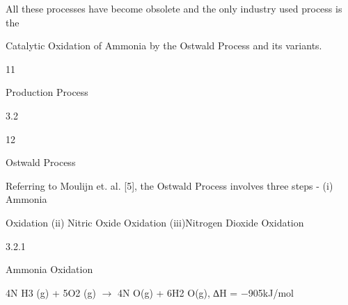 \documentclass[a4paper,portrait,12pt]{article}
\begin{document}
\begin{flushleft}
All these processes have become obsolete and the only industry used process is the
\end{flushleft}


\begin{flushleft}
Catalytic Oxidation of Ammonia by the Ostwald Process and its variants.
\end{flushleft}





11





\begin{flushleft}
\newpage
Production Process
\end{flushleft}





3.2





12





\begin{flushleft}
Ostwald Process
\end{flushleft}





\begin{flushleft}
Referring to Moulijn et. al. [5], the Ostwald Process involves three steps - (i) Ammonia
\end{flushleft}


\begin{flushleft}
Oxidation (ii) Nitric Oxide Oxidation (iii)Nitrogen Dioxide Oxidation
\end{flushleft}





3.2.1





\begin{flushleft}
Ammonia Oxidation
\end{flushleft}


\begin{flushleft}
4N H3 (g) + 5O2 (g) $\rightarrow$ 4N O(g) + 6H2 O(g), ∆H = $-$905kJ/mol
\end{flushleft}
\end{document}
